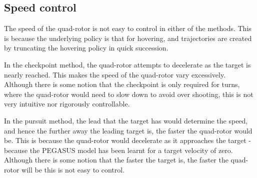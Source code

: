 \documentclass[hidelinks,BTech]{iitmdiss}
\begin{document}
\subsection{Speed control}
The speed of the quad-rotor is not easy to control in either of the methods. This is because the underlying policy is that for hovering, and trajectories are created by truncating the hovering policy in quick succession.

In the checkpoint method, the quad-rotor attempts to decelerate as the target is nearly reached. This makes the speed of the quad-rotor vary excessively. Although there is some notion that the checkpoint is only required for turns, where the quad-rotor would need to slow down to avoid over shooting, this is not very intuitive nor rigorously controllable.

In the pursuit method, the lead that the target has would determine the speed, and hence the further away the leading target is, the faster the quad-rotor would be. This is because the quad-rotor would decelerate as it approaches the target - because the PEGASUS model has been learnt for a target velocity of zero. Although there is some notion that the faster the target is, the faster the quad-rotor will be this is not easy to control.


\begin{singlespace}
  
\end{singlespace}
\end{document}
